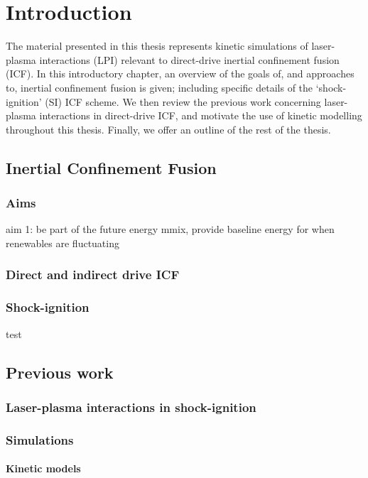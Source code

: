 \chapter{Introduction}
\label{chp:introduction}
The material presented in this thesis represents kinetic simulations of laser-plasma interactions (\acrshort{LPI}) relevant to direct-drive inertial confinement fusion (\acrshort{ICF}). In this introductory chapter, an overview of the goals of, and approaches to, inertial confinement fusion is given; including specific details of the `shock-ignition' (\acrshort{SI}) ICF scheme. We then review the previous work concerning laser-plasma interactions in direct-drive ICF, and motivate the use of kinetic modelling throughout this thesis. Finally, we offer an outline of the rest of the thesis.

\section{Inertial Confinement Fusion}
\subsection{Aims}
aim 1: be part of the future energy mmix, provide baseline energy for when renewables are fluctuating \citep{Nicholas2021}
\subsection{Direct and indirect drive ICF}
\subsection{Shock-ignition}
test\citep{Ribeyre2009}


\section{Previous work}
\subsection{Laser-plasma interactions in shock-ignition}
\subsection{Simulations}
\subsubsection{Kinetic models}
